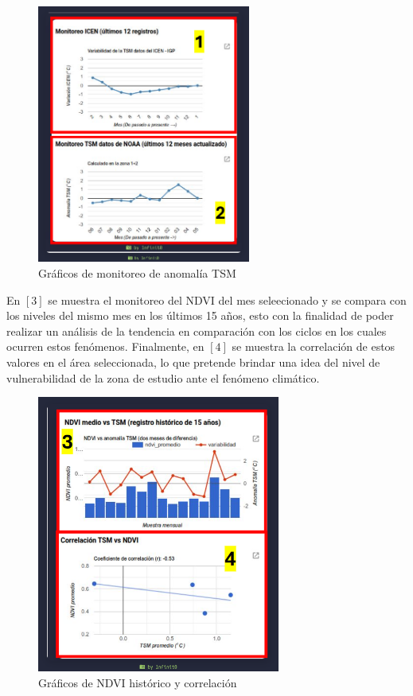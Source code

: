 \begin{figure}[ht]
  \centering
  \includegraphics[width=7cm, trim=37px 48px 38px 32px, clip]{assets/grafico1.png}
  \caption{Gráficos de monitoreo de anomalía TSM}
  \label{fig:tsm}
\end{figure}

\newpage

En $[3]$ se muestra el monitoreo del NDVI del mes seleecionado y se compara con los niveles del mismo mes en los últimos 15 años, esto con la finalidad de poder realizar un análisis de la tendencia en comparación con los ciclos en los cuales ocurren estos fenómenos. Finalmente, en $[4]$ se muestra la correlación de estos valores en el área seleccionada, lo que pretende brindar una idea del nivel de vulnerabilidad de la zona de estudio ante el fenómeno climático.

\begin{figure}[ht]
  \centering
  \includegraphics[width=8cm, trim=37px 29px 25px 25px, clip]{assets/correlacion.png}
  \caption{Gráficos de NDVI histórico y correlación}
  \label{fig:correlación}
\end{figure}